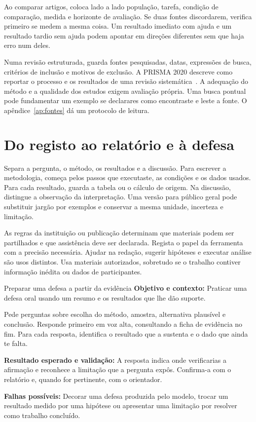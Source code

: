 Ao comparar artigos, coloca lado a lado população, tarefa, condição de comparação, medida e horizonte de avaliação. Se duas fontes discordarem, verifica primeiro se medem a mesma coisa. Um resultado imediato com ajuda e um resultado tardio sem ajuda podem apontar em direções diferentes sem que haja erro num deles.

Numa revisão estruturada, guarda fontes pesquisadas, datas, expressões de busca, critérios de inclusão e motivos de exclusão. A PRISMA 2020 descreve como reportar o processo e os resultados de uma revisão sistemática~\citep{prisma2020}. A adequação do método e a qualidade dos estudos exigem avaliação própria. Uma busca pontual pode fundamentar um exemplo se declarares como encontraste e leste a fonte. O apêndice~\ref{ap:fontes} dá um protocolo de leitura.

\section{Do registo ao relatório e à defesa}

Separa a pergunta, o método, os resultados e a discussão. Para escrever a metodologia, começa pelos passos que executaste, as condições e os dados usados. Para cada resultado, guarda a tabela ou o cálculo de origem. Na discussão, distingue a observação da interpretação. Uma versão para público geral pode substituir jargão por exemplos e conservar a mesma unidade, incerteza e limitação.

As regras da instituição ou publicação determinam que materiais podem ser partilhados e que assistência deve ser declarada. Regista o papel da ferramenta com a precisão necessária. Ajudar na redação, sugerir hipóteses e executar análise são usos distintos. Usa materiais autorizados, sobretudo se o trabalho contiver informação inédita ou dados de participantes.

\begin{promptlabbox}{Preparar uma defesa a partir da evidência}
\textbf{Objetivo e contexto:} Praticar uma defesa oral usando um resumo e os resultados que lhe dão suporte.

Pede perguntas sobre escolha do método, amostra, alternativa plausível e conclusão. Responde primeiro em voz alta, consultando a ficha de evidência no fim. Para cada resposta, identifica o resultado que a sustenta e o dado que ainda te falta.

\textbf{Resultado esperado e validação:} A resposta indica onde verificarias a afirmação e reconhece a limitação que a pergunta expôs. Confirma-a com o relatório e, quando for pertinente, com o orientador.

\textbf{Falhas possíveis:} Decorar uma defesa produzida pelo modelo, trocar um resultado medido por uma hipótese ou apresentar uma limitação por resolver como trabalho concluído.
\end{promptlabbox}
